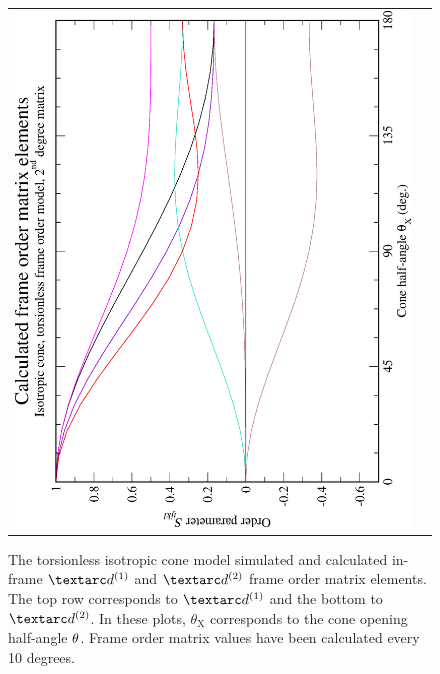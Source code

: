 \begin{figure}
\begin{tabular}{@{}cc@{}}
    \includegraphics[width=.35\textwidth,angle=270]{images/frame_order_matrix/Sijkl_iso_cone_torsionless_in_frame_theta_x_calc.eps} \\
  \end{tabular}
  \caption[Torsionless isotropic cone simulated and calculated in-frame Daeg$^{(1)}$ and Daeg$^{(2)}$ elements.]{
    The torsionless isotropic cone model simulated and calculated in-frame $\FOone$ and $\FOtwo$ frame order matrix elements.
    The top row corresponds to $\FOone$ and the bottom to $\FOtwo$.
    In these plots, $\theta_\textrm{X}$ corresponds to the cone opening half-angle $\theta$.
    Frame order matrix values have been calculated every 10 degrees.
  }
  \label{fig: simulated and calculated in-frame 1st and 2nd degree iso cone, torsionless frame order}
\end{figure}

